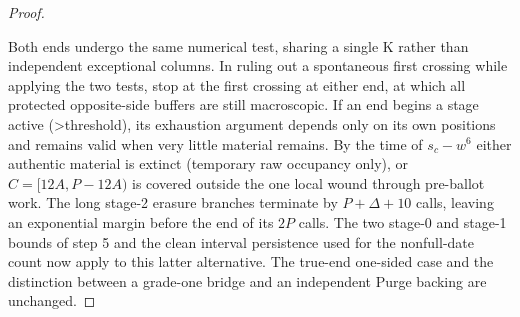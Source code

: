 \begin{proof}
\begin{enumerate}
\end{enumerate}

Both ends undergo the same numerical test, sharing a single K rather than independent exceptional columns. In ruling out a spontaneous first crossing while applying the two tests, stop at the first crossing at either end, at which all protected opposite-side buffers are still macroscopic. If an end begins a stage active (\textgreater{}threshold), its exhaustion argument depends only on its own positions and remains valid when very little material remains. By the time of \(s_c- w^6\) either authentic material is extinct (temporary raw occupancy only), or \(C=[12A,P- 12A)\) is covered outside the one local wound through pre-ballot work. The long stage-2 erasure branches terminate by \(P+\Delta +10\) calls, leaving an exponential margin before the end of its \(2P\) calls. The two stage-0 and stage-1 bounds of step 5 and the clean interval persistence used for the nonfull-date count now apply to this latter alternative. The true-end one-sided case and the distinction between a grade-one bridge and an independent Purge backing are unchanged.
\end{proof}

